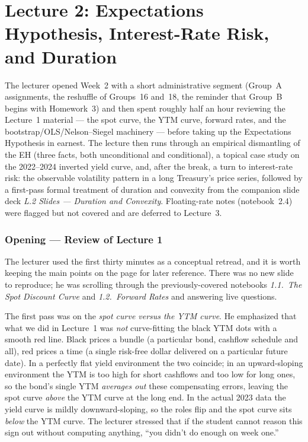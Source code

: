 \part*{Lecture 2: Expectations Hypothesis, Interest-Rate Risk, and Duration}

The lecturer opened Week~2 with a short administrative segment (Group~A
assignments, the reshuffle of Groups~16 and~18, the reminder that Group~B
begins with Homework~3) and then spent roughly half an hour reviewing the
Lecture~1 material --- the spot curve, the YTM curve, forward rates, and the
bootstrap/OLS/Nelson--Siegel machinery --- before taking up the Expectations
Hypothesis in earnest. The lecture then runs through an empirical dismantling
of the EH (three facts, both unconditional and conditional), a topical case
study on the 2022--2024 inverted yield curve, and, after the break, a turn to
interest-rate risk: the observable volatility pattern in a long Treasury's
price series, followed by a first-pass formal treatment of duration and
convexity from the companion slide deck \emph{L.2 Slides --- Duration and
Convexity}. Floating-rate notes (notebook~2.4) were flagged but not covered
and are deferred to Lecture~3.

\section{Opening --- Review of Lecture 1}\label{L2-sec:review}

The lecturer used the first thirty minutes as a conceptual retread, and it is
worth keeping the main points on the page for later reference. There was no
new slide to reproduce; he was scrolling through the previously-covered
notebooks \emph{1.1.~The Spot Discount Curve} and \emph{1.2.~Forward Rates}
and answering live questions.

The first pass was on the \emph{spot curve versus the YTM curve}. He
emphasized that what we did in Lecture~1 was \emph{not} curve-fitting the
black YTM dots with a smooth red line. Black prices a bundle (a particular
bond, cashflow schedule and all), red prices a time (a single risk-free dollar
delivered on a particular future date). In a perfectly flat yield environment
the two coincide; in an upward-sloping environment the YTM is too high for
short cashflows and too low for long ones, so the bond's single YTM
\emph{averages out} these compensating errors, leaving the spot curve
\emph{above} the YTM curve at the long end. In the actual 2023 data the yield
curve is mildly downward-sloping, so the roles flip and the spot curve sits
\emph{below} the YTM curve. The lecturer stressed that if the student cannot
reason this sign out without computing anything, ``you didn't do enough on
week one.''

